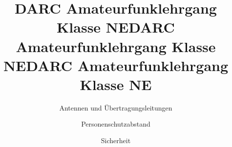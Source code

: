 \documentclass[aspectratio = 169]{beamer}
\begin{document}
\title{DARC Amateurfunklehrgang Klasse NE}
\author{Antennen und Übertragungsleitungen}
\begin{frame}
\maketitle
\end{frame}
































\title{DARC Amateurfunklehrgang Klasse NE}
\author{Personenschutzabstand}
\begin{frame}
\maketitle
\end{frame}












\title{DARC Amateurfunklehrgang Klasse NE}
\author{Sicherheit}
\begin{frame}
\maketitle
\end{frame}










\end{document}

